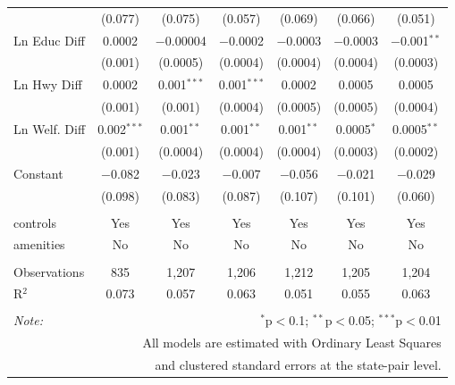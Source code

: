 \begin{table}[!htbp]
\begin{tabular}{@{\extracolsep{5pt}}lcccccc}
  & (0.077) & (0.075) & (0.057) & (0.069) & (0.066) & (0.051) \\ 
  Ln Educ Diff & 0.0002 & $-$0.00004 & $-$0.0002 & $-$0.0003 & $-$0.0003 & $-$0.001$^{**}$ \\ 
  & (0.001) & (0.0005) & (0.0004) & (0.0004) & (0.0004) & (0.0003) \\ 
  Ln Hwy Diff & 0.0002 & 0.001$^{***}$ & 0.001$^{***}$ & 0.0002 & 0.0005 & 0.0005 \\ 
  & (0.001) & (0.001) & (0.0004) & (0.0005) & (0.0005) & (0.0004) \\ 
  Ln Welf. Diff & 0.002$^{***}$ & 0.001$^{**}$ & 0.001$^{**}$ & 0.001$^{**}$ & 0.0005$^{*}$ & 0.0005$^{**}$ \\ 
  & (0.001) & (0.0004) & (0.0004) & (0.0004) & (0.0003) & (0.0002) \\ 
  Constant & $-$0.082 & $-$0.023 & $-$0.007 & $-$0.056 & $-$0.021 & $-$0.029 \\ 
  & (0.098) & (0.083) & (0.087) & (0.107) & (0.101) & (0.060) \\ 
 \hline \\[-1.8ex] 
controls & Yes & Yes & Yes & Yes & Yes & Yes \\ 
amenities & No & No & No & No & No & No \\ 
\hline \\[-1.8ex] 
Observations & 835 & 1,207 & 1,206 & 1,212 & 1,205 & 1,204 \\ 
R$^{2}$ & 0.073 & 0.057 & 0.063 & 0.051 & 0.055 & 0.063 \\ 
\hline 
\hline \\[-1.8ex] 
\textit{Note:}  & \multicolumn{6}{r}{$^{*}$p$<$0.1; $^{**}$p$<$0.05; $^{***}$p$<$0.01} \\ 
 & \multicolumn{6}{r}{All models are estimated with Ordinary Least Squares} \\ 
 & \multicolumn{6}{r}{and clustered standard errors at the state-pair level.} \\ 
\end{tabular} 
\end{table} 
